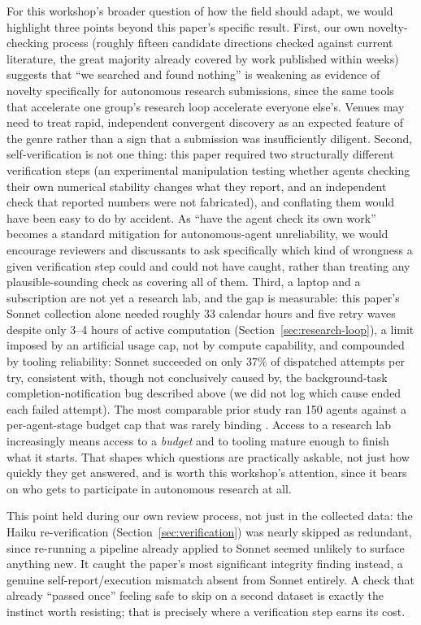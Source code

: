 \documentclass{article}
\begin{document}
For this workshop's broader question of how the field should adapt, we would highlight
three points beyond this paper's specific result. First, our own novelty-checking process
(roughly fifteen candidate directions checked against current literature, the great
majority already covered by work published within weeks) suggests that ``we searched
and found nothing'' is weakening as evidence of novelty specifically for autonomous
research submissions, since the same tools that accelerate one group's research loop
accelerate everyone else's. Venues may need to treat rapid, independent convergent
discovery as an expected feature of the genre rather than a sign that a submission was
insufficiently diligent. Second, self-verification is not one thing: this paper required
two structurally different verification steps (an experimental manipulation testing
whether agents checking their own numerical stability changes what they report, and an
independent check that reported numbers were not fabricated), and conflating them would
have been easy to do by accident. As ``have the agent check its own work'' becomes a
standard mitigation for autonomous-agent unreliability, we would encourage reviewers and
discussants to ask specifically which kind of wrongness a given verification step could
and could not have caught, rather than treating any plausible-sounding check as covering
all of them. Third, a laptop and a subscription are not yet a research lab, and the gap is
measurable: this paper's Sonnet collection alone needed roughly 33 calendar hours and five
retry waves despite only 3--4 hours of active computation (Section~\ref{sec:research-loop}),
a limit imposed by an artificial usage cap, not by compute capability, and compounded by
tooling reliability: Sonnet succeeded on only 37\% of dispatched attempts per try,
consistent with, though not conclusively caused by, the background-task
completion-notification bug described above (we did not log which cause ended each failed
attempt). The most comparable prior study ran 150 agents against a per-agent-stage budget cap
that was rarely binding \citep{gaoxiao2026}. Access to a research lab increasingly means access to a
\emph{budget} and to tooling mature enough to finish what it starts. That shapes which
questions are practically askable, not just how quickly they get answered, and is worth
this workshop's attention, since it bears on who gets to participate in autonomous
research at all.

This point held during our own review process, not just in the collected data: the Haiku
re-verification (Section~\ref{sec:verification}) was nearly skipped as redundant, since
re-running a pipeline already applied to Sonnet seemed unlikely to surface anything new. It
caught the paper's most significant integrity finding instead, a genuine self-report/execution
mismatch absent from Sonnet entirely. A check that already ``passed once'' feeling safe to
skip on a second dataset is exactly the instinct worth resisting; that is precisely where a
verification step earns its cost.
\end{document}
